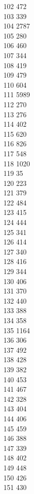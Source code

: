 { 102	472 \\
 103	339 \\
 104	2787 \\
 105	280 \\
 106	460 \\
 107	344 \\
 108	419 \\
 109	479 \\
 110	604 \\
 111	5989 \\
 112	270 \\
 113	276 \\
 114	402 \\
 115	620 \\
 116	826 \\
 117	548 \\
 118	1020 \\
 119	35 \\
 120	223 \\
 121	379 \\
 122	484 \\
 123	415 \\
 124	444 \\
 125	341 \\
 126	414 \\
 127	340 \\
 128	416 \\
 129	344 \\
 130	406 \\
 131	370 \\
 132	440 \\
 133	388 \\
 134	358 \\
 135	1164 \\
 136	306 \\
 137	492 \\
 138	428 \\
 139	382 \\
 140	453 \\
 141	467 \\
 142	328 \\
 143	404 \\
 144	406 \\
 145	459 \\
 146	388 \\
 147	339 \\
 148	402 \\
 149	448 \\
 150	426 \\
 151	430 \\
}
